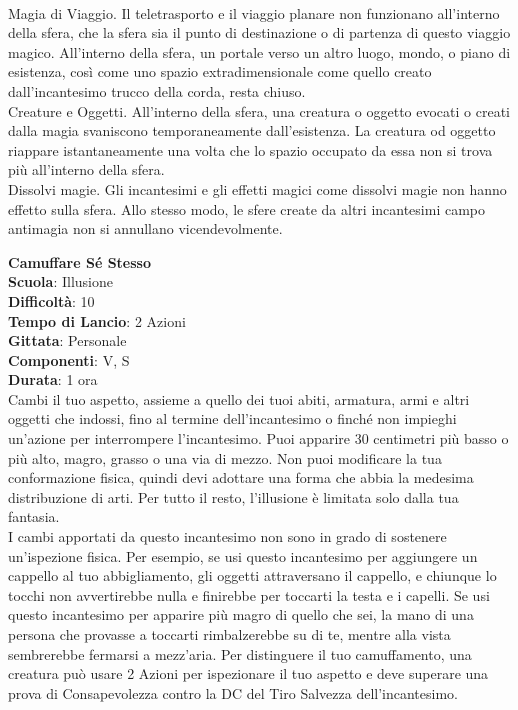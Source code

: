 \begin{multicols}{2}
\\Magia di Viaggio. Il teletrasporto e il viaggio planare non funzionano all'interno della sfera, che la sfera sia il punto di destinazione o di partenza di questo viaggio magico. All'interno della sfera, un portale verso un altro luogo, mondo, o piano di esistenza, così come uno spazio extradimensionale come quello creato dall'incantesimo trucco della corda, resta chiuso.
\\Creature e Oggetti. All'interno della sfera, una creatura o oggetto evocati o creati dalla magia svaniscono temporaneamente dall'esistenza. La creatura od oggetto riappare istantaneamente una volta che lo spazio occupato da essa non si trova più all'interno della sfera.
\\Dissolvi magie. Gli incantesimi e gli effetti magici come dissolvi magie non hanno effetto sulla sfera. Allo stesso modo, le sfere create da altri incantesimi campo antimagia non si annullano vicendevolmente. 

\medskip\textbf{Camuffare Sé Stesso}\\
\textbf{Scuola}: Illusione\\
\textbf{Difficoltà}:  10\\
\textbf{Tempo di Lancio}: 2 Azioni\\
\textbf{Gittata}: Personale\\
\textbf{Componenti}: V, S\\
\textbf{Durata}: 1 ora\\
Cambi il tuo aspetto, assieme a quello dei tuoi abiti, armatura, armi e altri oggetti che indossi, fino al termine dell'incantesimo o finché non impieghi un'azione per interrompere l'incantesimo. Puoi apparire 30 centimetri più basso o più alto, magro, grasso o una via di mezzo. Non puoi modificare la tua conformazione fisica, quindi devi adottare una forma che abbia la medesima distribuzione di arti. Per tutto il resto, l’illusione è limitata solo dalla tua fantasia.\\
I cambi apportati da questo incantesimo non sono in grado di sostenere un'ispezione fisica. Per esempio, se usi questo incantesimo per aggiungere un cappello al tuo abbigliamento, gli oggetti attraversano il cappello, e chiunque lo tocchi non avvertirebbe nulla e finirebbe per toccarti la testa e i capelli. Se usi questo incantesimo per apparire più magro di quello che sei, la mano di una persona che provasse a toccarti rimbalzerebbe su di te, mentre alla vista sembrerebbe fermarsi a mezz’aria. Per distinguere il tuo camuffamento, una creatura può usare 2 Azioni per ispezionare il tuo aspetto e deve superare una prova di Consapevolezza contro la DC del Tiro Salvezza dell'incantesimo. 


\end{multicols}
